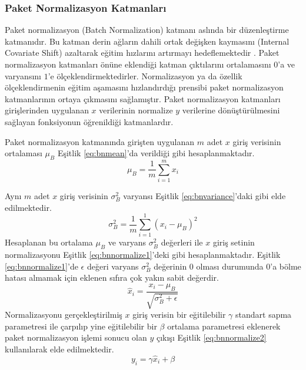 \subsubsection{Paket Normalizasyon Katmanları \label{lyr:batchnormalization}}
Paket normalizasyon (Batch Normalization) katmanı aslında bir düzenleştirme katmanıdır. Bu katman derin ağların dahili ortak değişken kaymasını (Internal Covariate Shift) azaltarak eğitim hızlarını artırmayı hedeflemektedir \cite{ioffe2015batch}. Paket normalizasyon katmanları önüne eklendiği katman çıktılarını ortalamasını $0$'a ve varyansını $1$'e ölçeklendirmektedirler. Normalizasyon ya da özellik ölçeklendirmenin eğitim aşamasını hızlandırdığı prensibi paket normalizasyon katmanlarının ortaya çıkmasını sağlamıştır. Paket normalizasyon katmanları girişlerinden uygulanan $x$ verilerinin normalize $y$ verilerine dönüştürülmesini sağlayan fonksiyonun öğrenildiği katmanlardır.

Paket normalizasyon katmanında girişten uygulanan $m$ adet $x$ giriş verisinin ortalaması $\mu_{B}$ Eşitlik \ref{eq:bnmean}'da verildiği gibi hesaplanmaktadır. 
\begin{equation}
	\label{eq:bnmean}
	\mu_{B}=\frac{1}{m} \sum_{i=1}^{m} x_{i}
\end{equation}

Aynı $m$ adet $x$ giriş verisinin $\sigma^{2}_{B}$ varyansı Eşitlik \ref{eq:bnvariance}'daki gibi elde edilmektedir.
\begin{equation}
	\label{eq:bnvariance}
	\sigma_{B}^{2}=\frac{1}{m} \sum_{i=1}^{1}\left(x_{i}-\mu_{B}\right)^{2}
\end{equation}
Hesaplanan bu ortalama $\mu_{B}$ ve varyans $\sigma^{2}_{B}$ değerleri ile $x$ giriş setinin normalizasyonu Eşitlik \ref{eq:bnnormalize1}'deki gibi hesaplanmaktadır. Eşitlik \ref{eq:bnnormalize1}'de $\epsilon$ değeri varyans $\sigma^{2}_{B}$ değerinin $0$ olması durumunda $0$'a bölme hatası almamak için eklenen sıfıra çok yakın sabit değerdir.
\begin{equation}
	\label{eq:bnnormalize1}
	\hat{x}_{i}=\frac{x_{i}-\mu_{B}}{\sqrt{\sigma_{B}^{2}+\epsilon}}
\end{equation}
Normalizasyonu gerçekleştirilmiş $x$ giriş verisin bir eğitilebilir $\gamma$ standart sapma parametresi ile çarpılıp yine eğitilebilir bir $\beta$ ortalama parametresi eklenerek paket normalizasyon işlemi sonucu olan $y$ çıkışı Eşitlik \ref{eq:bnnormalize2} kullanılarak elde edilmektedir.
\begin{equation}
	\label{eq:bnnormalize2}
	y_{i}=\gamma \hat{x}_{i}+\beta
\end{equation}


